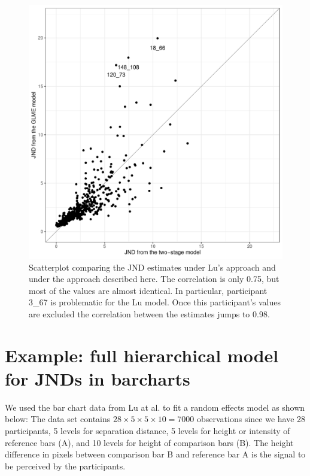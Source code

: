 \begin{knitrout}
\color{fgcolor}\begin{figure}
\includegraphics[width=\maxwidth]{figure/models-1} \caption[Scatterplot comparing the JND estimates under Lu's approach and under the approach described here]{Scatterplot comparing the JND estimates under Lu's approach and under the approach described here. The correlation is only 0.75, but most of the values are almost identical. In particular, participant 3\_67 is problematic for the Lu model. Once this participant's values are excluded the correlation between the estimates jumps to 0.98.}\label{fig:models}
\end{figure}

\end{knitrout}


\section{Example: full hierarchical model for JNDs in barcharts}
We used the bar chart data from Lu at al. \cite{JNDVIS21} to fit a random effects model as shown below: The data set contains $28 \times 5 \times 5 \times 10 = 7000$ observations since we have 28 participants, 5 levels for separation distance, 5 levels for height or intensity of reference bars (A), and 10 levels for height of comparison bars (B). The height difference in pixels between comparison bar B and reference bar A is the signal to be perceived by the participants.

